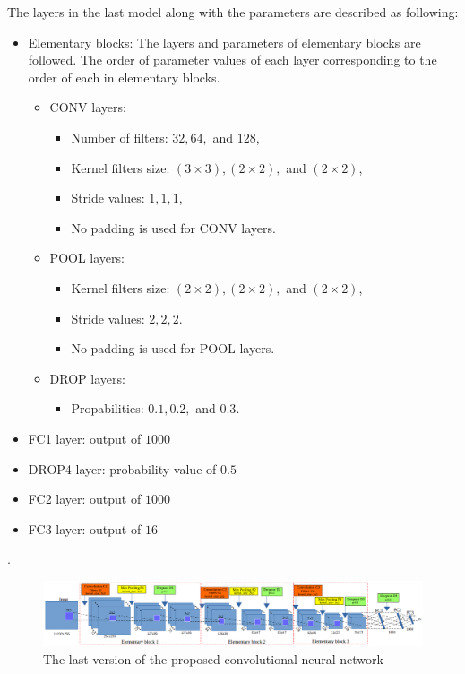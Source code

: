 \documentclass[10pt]{article}
\begin{document}
The layers in the last model along with the parameters are described as following:
\begin{itemize}[nosep,label=\footnotesize$\bullet$]
	\item Elementary blocks: The layers and parameters of elementary blocks are followed. The order of parameter values of each layer corresponding to the order of each in elementary blocks.
	\begin{itemize}[nosep]
		\item CONV layers:
		\begin{itemize}[nosep]
			\item Number of filters: $32, 64,$ and $128$,
			\item Kernel filters size: $(3 \times 3), (2 \times 2),$ and $(2 \times 2)$,
			\item Stride values: $1, 1, 1$,
			\item No padding is used for CONV layers.
		\end{itemize}			
	\item POOL layers:
		\begin{itemize}[nosep]
			\item Kernel filters size: $(2 \times 2), (2 \times 2),$ and $(2 \times 2)$,
			\item Stride values: $2, 2, 2$.
			\item No padding is used for POOL layers.
		\end{itemize}
	\item DROP layers: 
		\begin{itemize}[nosep]
			\item Propabilities: $0.1, 0.2, $ and $0.3$.
		\end{itemize}
	\end{itemize}
	
	\item FC1 layer: output of $1000$
	\item DROP4 layer: probability value of $0.5$
	\item FC2 layer: output of $1000$
	\item FC3 layer: output of $16$
\end{itemize}.

\begin{figure}[!t]
\centering
\includegraphics[scale=0.32]{images/arch_model}
\caption{The last version of the proposed convolutional neural network} 
\label{cnnnetwork2}
\end{figure}
\end{document}

